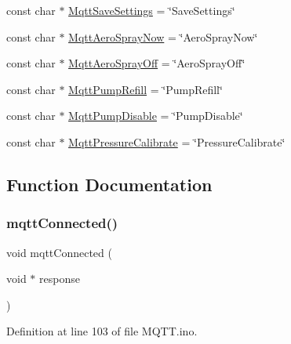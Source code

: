 \begin{DoxyCompactItemize}
\item 
const char $\ast$ \mbox{\hyperlink{_m_q_t_t_8ino_a4734bf8d4d26cdd7e3e322caf27716e0}{Mqtt\+Save\+Settings}} = \char`\"{}Save\+Settings\char`\"{}
\item 
const char $\ast$ \mbox{\hyperlink{_m_q_t_t_8ino_afad460b71f5a1b80266f610462c30eb8}{Mqtt\+Aero\+Spray\+Now}} = \char`\"{}Aero\+Spray\+Now\char`\"{}
\item 
const char $\ast$ \mbox{\hyperlink{_m_q_t_t_8ino_a18db3b99bbabfd1f942f9c966825bb6f}{Mqtt\+Aero\+Spray\+Off}} = \char`\"{}Aero\+Spray\+Off\char`\"{}
\item 
const char $\ast$ \mbox{\hyperlink{_m_q_t_t_8ino_a0d26f68d4ae315e6af62e256d9dcab63}{Mqtt\+Pump\+Refill}} = \char`\"{}Pump\+Refill\char`\"{}
\item 
const char $\ast$ \mbox{\hyperlink{_m_q_t_t_8ino_a6bb873a0115e9d7a67eef723d5e5f48d}{Mqtt\+Pump\+Disable}} = \char`\"{}Pump\+Disable\char`\"{}
\item 
const char $\ast$ \mbox{\hyperlink{_m_q_t_t_8ino_aa71fb2965e72473393945684b3e97fee}{Mqtt\+Pressure\+Calibrate}} = \char`\"{}Pressure\+Calibrate\char`\"{}
\end{DoxyCompactItemize}


\subsection{Function Documentation}
\mbox{\label{_m_q_t_t_8ino_a01bcd10c2afc9c7b39c5da283353945b}} 
\subsubsection{\texorpdfstring{mqttConnected()}{mqttConnected()}}
{\footnotesize\ttfamily void mqtt\+Connected (\begin{DoxyParamCaption}\item[{void $\ast$}]{response }\end{DoxyParamCaption})}



Definition at line 103 of file M\+Q\+T\+T.\+ino.

\mbox{\label{_m_q_t_t_8ino_acb866f89716f9272ccada4f9c9c7d09c}} 
